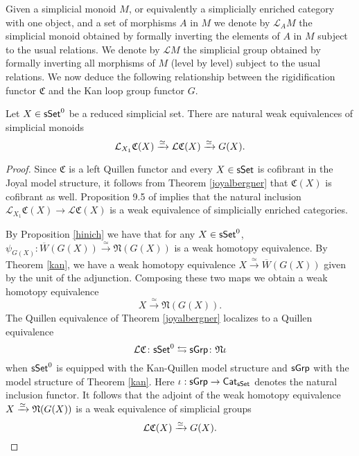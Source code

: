  Given a simplicial monoid $M$, or equivalently a simplicially enriched category with one object, and a set of morphisms $A$ in $M$ we denote by $\mathcal{L}_A M$ the simplicial monoid obtained by formally inverting the elements of $A$ in $M$ subject to the usual relations. We denote by $\mathcal{L}M$ the simplicial group obtained by formally inverting all morphisms of $M$ (level by level) subject to the usual relations. We now deduce the following relationship between the rigidification functor $\mathfrak{C}$ and the Kan loop group functor $G$.

\begin{proposition}\label{CandG} Let $X \in \mathsf{sSet}^0$ be a reduced simplicial set. There are natural weak equivalences of simplicial monoids
$$\mathcal{L}_{X_1} \mathfrak{C}(X) \xrightarrow{\simeq} \mathcal{L}\mathfrak{C}(X) \xrightarrow{\simeq} G(X).$$
\end{proposition}

\begin{proof}
Since $\mathfrak{C}$ is a left Quillen functor and every $X \in \mathsf{sSet}$ is cofibrant in the Joyal model structure, it follows from Theorem \ref{joyalbergner} that $\mathfrak{C}(X)$ is cofibrant as well. Proposition 9.5 of \cite{dwyer1980simplicial} implies that the natural inclusion $\mathcal{L}_{X_1} \mathfrak{C}(X) \to \mathcal{L}\mathfrak{C}(X)$ is a weak equivalence of simplicially enriched categories. 

By Proposition \ref{hinich} we have that for any $X \in \mathsf{sSet}^0$, $\psi_{G(X)}: \overline{W}(G(X)) \xrightarrow{\simeq} \mathfrak{N}(G(X))$ is a weak homotopy equivalence. By Theorem \ref{kan}, we have a weak homotopy equivalence $X \xrightarrow{\simeq} \overline{W}(G(X))$ given by the unit of the adjunction. Composing these two maps we obtain a weak homotopy equivalence
$$X \xrightarrow{\simeq} \mathfrak{N}(G(X)).$$ 
The Quillen equivalence of Theorem \ref{joyalbergner} localizes to a Quillen equivalence
$$\mathcal{L} \mathfrak{C} \colon \mathsf{sSet}^0 \leftrightarrows \mathsf{sGrp} \colon \mathfrak{N}\iota$$
when $\mathsf{sSet}^0$ is equipped with the Kan-Quillen model structure and $\mathsf{sGrp}$ with the model structure of Theorem \ref{kan}. Here $\iota: \mathsf{sGrp} \to \mathsf{Cat}_{\mathsf{sSet}}$ denotes the natural inclusion functor. It follows that the adjoint of the weak homotopy equivalence $X \xrightarrow{\simeq} \mathfrak{N}(G(X))$ is a weak equivalence of simplicial groups
$$\mathcal{L}\mathfrak{C}(X) \xrightarrow{\simeq} G(X).$$ 
\end{proof}

